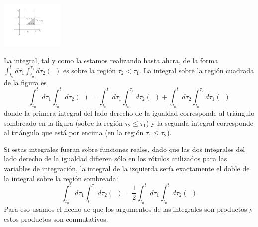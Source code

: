 \documentclass{beamer}
\begin{document}
\begin{frame}

    \begin{center}
        \includegraphics[width=3cm]{figs/nidos.pdf} 
    \end{center}

La integral, tal y como la estamos realizando hasta ahora, de la forma $\int_{t_0}^t d\tau_1\int_{t_0}^{\tau_1} d\tau_2(\ \ )$ es sobre la región $\tau_2<\tau_1$. La integral sobre la región cuadrada de la figura es
\begin{equation*}\int_{t_0}^t d\tau_1\int_{t_0}^t d\tau_2(\ \ )=
\int_{t_0}^t d\tau_1\int_{t_0}^{\tau_1} d\tau_2(\ \ )+
\int_{t_0}^t d\tau_2\int_{t_0}^{\tau_2} d\tau_1(\ \ )
\end{equation*}
donde la primera integral del lado derecho de la igualdad corresponde al triángulo sombreado en la figura (sobre la región $\tau_2\leq\tau_1$) y la segunda integral corresponde al triángulo que está por encima (en la región $\tau_1\leq\tau_2$). 

\end{frame}

\begin{frame}

    Si estas integrales fueran sobre funciones reales, dado que las dos integrales del lado derecho de la igualdad difieren sólo en los rótulos utilizados para las variables de integración, la integral de la izquierda sería exactamente el doble de la integral sobre la región sombreada:
    \begin{equation*}
    \int_{t_0}^t d\tau_1\int_{t_0}^{\tau_1} d\tau_2(\ \ )=
    \frac{1}{2}\int_{t_0}^t d\tau_1\int_{t_0}^t d\tau_2(\ \ )
    \end{equation*}
    Para eso usamos el hecho de que los argumentos de las integrales son productos y estos productos son conmutativos.

    \end{frame}
    
\end{document}
